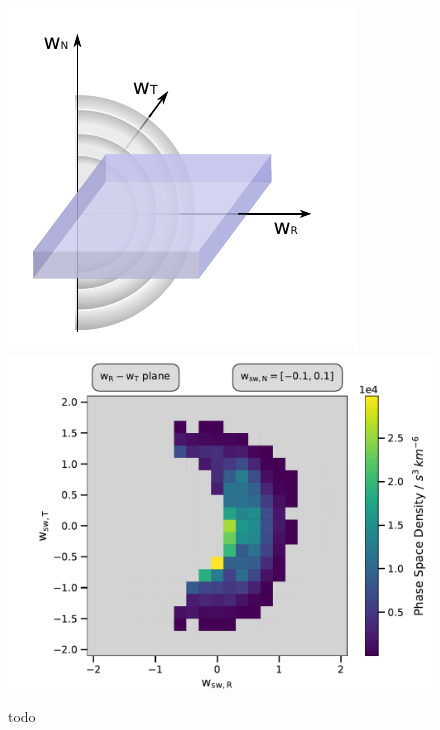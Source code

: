 
\begin{figure}[h]
	\includegraphics[width=.4\textwidth]{Figures/slice_N2.pdf}
	\includegraphics[scale=.45]{Figures/slice_psd_N.pdf}
	\centering
	\caption{todo}
	\label{fig:sketch_slice_N}
\end{figure}


%
%
%
\clearpage
